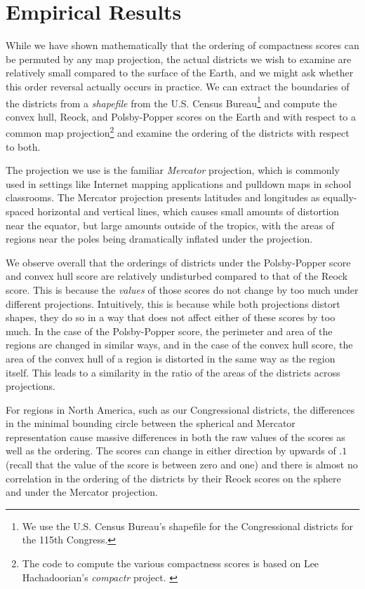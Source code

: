 
\section{Empirical Results}\label{sec:exper}




While we have shown mathematically that the ordering of compactness scores can be permuted by any map 
projection, the actual districts we wish to examine are relatively small compared to the surface of the Earth, 
and we might ask whether this order reversal actually occurs in practice.
We can extract the boundaries of the districts from a \textit{shapefile} from the U.S. Census Bureau\footnote{We use the U.S. Census Bureau's shapefile for the Congressional districts for the 115th Congress.} and compute the convex hull, Reock, and Polsby-Popper scores on the Earth and with respect to a common map projection\footnote{The code to compute the various compactness scores is based on Lee Hachadoorian's \textit{compactr} project. \cite{hachadoorian2018reock}} and examine the ordering of the districts with respect to both.

The projection we use is the familiar \textit{Mercator} projection, which is commonly used in settings like Internet mapping applications and pulldown maps in school classrooms.  
The Mercator projection presents latitudes and longitudes as equally-spaced horizontal and vertical lines, which causes small amounts of distortion near the equator, but large amounts outside of the tropics, with the areas of regions near the poles being dramatically inflated under the projection.








We observe overall that the orderings of districts under the Polsby-Popper score and convex hull score are relatively undisturbed compared to that of the Reock score.  This is because the \textit{values} of those scores do not change by too much under different projections.  Intuitively, this is because while both projections distort shapes, they do so in a way that does not affect either of these scores by too much. In the case of the Polsby-Popper score, the perimeter and area of the regions are changed in similar ways, and in the case of the convex hull score, the area of the convex hull of a region is distorted in the same way as the region itself. This leads to a similarity in the ratio of the areas of the districts across projections.

For regions in North America, such as our Congressional districts, the differences in the minimal bounding circle between the spherical and Mercator representation cause massive differences in both the raw values of the scores as well as the ordering.  The scores can change in either direction by upwards of $.1$ (recall that the value of the score is between zero and one) and there is almost no correlation in the ordering of the districts by their Reock scores on the sphere and under the Mercator projection. 

